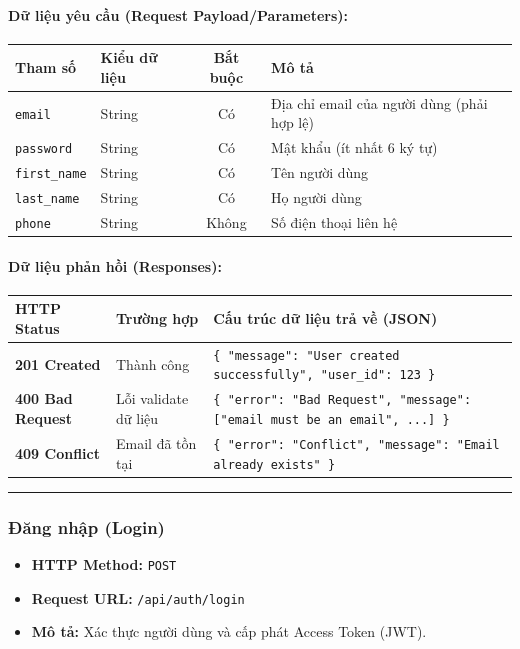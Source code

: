\documentclass[12pt,a4paper]{article}
\begin{document}
\paragraph{Dữ liệu yêu cầu (Request Payload/Parameters):}
\begin{longtable}{|>{\raggedright\arraybackslash}p{2.8cm}|>{\raggedright\arraybackslash}p{2.2cm}|c|>{\raggedright\arraybackslash}p{7.0cm}|}
\hline
\textbf{Tham số} & \textbf{Kiểu dữ liệu} & \textbf{Bắt buộc} & \textbf{Mô tả} \\ \hline
\endhead
\texttt{email} & String & Có & Địa chỉ email của người dùng (phải hợp lệ) \\ \hline
\texttt{password} & String & Có & Mật khẩu (ít nhất 6 ký tự) \\ \hline
\texttt{first\_name} & String & Có & Tên người dùng \\ \hline
\texttt{last\_name} & String & Có & Họ người dùng \\ \hline
\texttt{phone} & String & Không & Số điện thoại liên hệ \\ \hline
\end{longtable}

\paragraph{Dữ liệu phản hồi (Responses):}
\begin{longtable}{|>{\raggedright\arraybackslash}p{2.8cm}|>{\raggedright\arraybackslash}p{3.2cm}|>{\raggedright\arraybackslash}p{8.0cm}|}
\hline
\textbf{HTTP Status} & \textbf{Trường hợp} & \textbf{Cấu trúc dữ liệu trả về (JSON)} \\ \hline
\endhead
\textbf{201 Created} & Thành công & \texttt{\{ "message": "User created successfully", "user\_id": 123 \}} \\ \hline
\textbf{400 Bad Request} & Lỗi validate dữ liệu & \texttt{\{ "error": "Bad Request", "message": ["email must be an email", ...] \}} \\ \hline
\textbf{409 Conflict} & Email đã tồn tại & \texttt{\{ "error": "Conflict", "message": "Email already exists" \}} \\ \hline
\end{longtable}

\vskip 0.4cm
\noindent\rule{\textwidth}{0.3pt}
\vskip 0.4cm

\subsubsection{Đăng nhập (Login)}
\begin{itemize}[leftmargin=*]
    \item \textbf{HTTP Method:} \texttt{POST}
    \item \textbf{Request URL:} \texttt{/api/auth/login}
    \item \textbf{Mô tả:} Xác thực người dùng và cấp phát Access Token (JWT).
\end{itemize}
\end{document}
